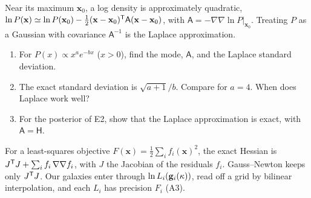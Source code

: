 
\begin{given}
Near its maximum $\mathbf x_0$, a log density is approximately quadratic,
$\ln P(\mathbf x) \simeq \ln P(\mathbf x_0) - \tfrac12(\mathbf x - \mathbf x_0)^{\mathsf{T}}\mathsf A(\mathbf x - \mathbf x_0)$, with
$\mathsf A = -\nabla\nabla\ln P|_{\mathbf x_0}$. Treating $P$ as a Gaussian with covariance $\mathsf A^{-1}$ is the
Laplace approximation.
\end{given}


\begin{enumerate}
  \item For $P(x) \propto x^a e^{-bx}$ ($x > 0$), find the mode, $\mathsf A$, and the Laplace standard deviation.
  \item The exact standard deviation is $\sqrt{a+1}/b$. Compare for $a = 4$. When does Laplace work well?
  \item For the posterior of E2, show that the Laplace approximation is exact, with $\mathsf A = \mathsf H$.
\end{enumerate}



\begin{given}
For a least-squares objective $F(\mathbf x) = \tfrac12\sum_i f_i(\mathbf x)^2$, the exact Hessian is
$J^{\mathsf{T}} J + \sum_i f_i\,\nabla\nabla f_i$, with $J$ the Jacobian of the residuals $f_i$. Gauss--Newton keeps only $J^{\mathsf{T}} J$.
Our galaxies enter through $\ln L_i(\mathbf{g}_i(\kappa))$, read off a grid by bilinear interpolation, and each $L_i$ has
precision $F_i$ (A3).
\end{given}


